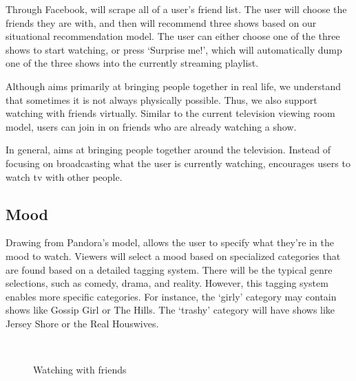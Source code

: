 Through Facebook, {\sys} will scrape all of a user’s friend list.  The
user will choose the friends they are with, and then {\sys} will
recommend three shows based on our situational recommendation model.
The user can either choose one of the three shows to start watching,
or press ‘Surprise me!’, which will automatically dump one of the
three shows into the currently streaming playlist.

Although {\sys} aims primarily at bringing people together in real
life, we understand that sometimes it is not always physically
possible.  Thus, we also support watching with friends virtually.
Similar to the current television viewing room model, users can join
in on friends who are already watching a show.

In general, {\sys} aims at bringing people together around the
television.  Instead of focusing on broadcasting what the user is
currently watching, {\sys} encourages users to watch tv with other
people.

\subsection{Mood}
Drawing from Pandora’s model, {\sys} allows the user to specify what
they’re in the mood to watch.  Viewers will select a mood based on
specialized categories that are found based on a detailed tagging
system.  There will be the typical genre selections, such as comedy,
drama, and reality.  However, this tagging system enables more
specific categories.  For instance, the ‘girly’ category may contain
shows like Gossip Girl or The Hills.  The ‘trashy’ category will have
shows like Jersey Shore or the Real Houswives.

\begin{figure}
\centering
{}
~~
\caption{Watching with friends}
\label{fig:friends}
\end{figure}

